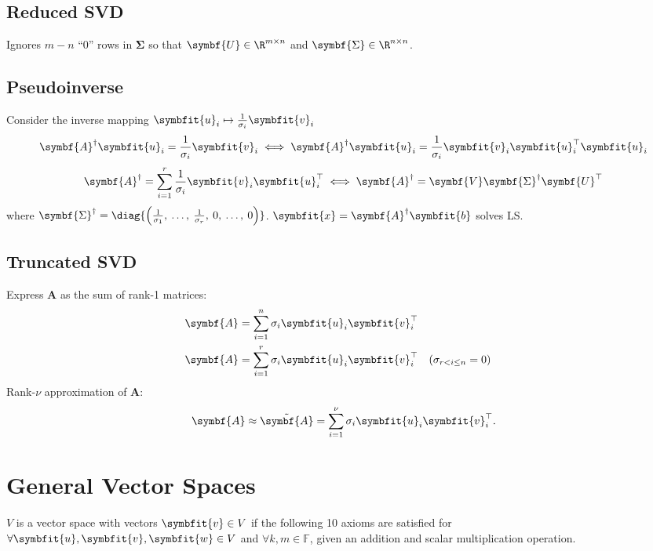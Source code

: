 \documentclass{article}
\begin{document}
\begin{multicols*}{3}
    \subsection{Reduced SVD}
    Ignores \(m - n\) ``0'' rows in \(\symbf{\Sigma}\) so that \(\symbf{U} \in \R^{m \times n}\) and \(\symbf{\Sigma} \in \R^{n \times n}\).
    \subsection{Pseudoinverse}
    Consider the inverse mapping \(\symbfit{u}_i \mapsto \frac{1}{\sigma_i} \symbfit{v}_i\)
    \begin{equation*}
        \symbf{A}^\dagger \symbfit{u}_i = \frac{1}{\sigma_i} \symbfit{v}_i
        \iff
        \symbf{A}^\dagger \symbfit{u}_i = \frac{1}{\sigma_i} \symbfit{v}_i \symbfit{u}^\top_i \symbfit{u}_i
    \end{equation*}
    \begin{equation*}
        \symbf{A}^\dagger = \sum_{i = 1}^r \frac{1}{\sigma_i} \symbfit{v}_i \symbfit{u}^\top_i
        \iff
        \symbf{A}^\dagger = \symbf{V} \symbf{\Sigma}^\dagger \symbf{U}^\top
    \end{equation*}
    where \(\symbf{\Sigma}^\dagger = \diag{\left( \frac{1}{\sigma_1},\: \dots,\: \frac{1}{\sigma_r},\: 0,\: \dots,\: 0 \right)}\).
    \(\symbfit{x} = \symbf{A}^\dagger \symbfit{b}\) solves LS\@.
    \subsection{Truncated SVD}
    Express \(\symbf{A}\) as the sum of rank-1 matrices:
    \begin{align*}
        \symbf{A} & = \sum_{i = 1}^n \sigma_i \symbfit{u}_i \symbfit{v}^\top_i                                  \\
        \symbf{A} & = \sum_{i = 1}^r \sigma_i \symbfit{u}_i \symbfit{v}^\top_i &  & (\sigma_{r < i \leq n} = 0)
    \end{align*}
    Rank-\(\nu\) approximation of \(\symbf{A}\):
    \begin{equation*}
        \symbf{A} \approx \tilde{\symbf{A}} = \sum_{i = 1}^\nu \sigma_i \symbfit{u}_i \symbfit{v}^\top_i.
    \end{equation*}
    \section{General Vector Spaces}
    \(V\) is a vector space with vectors \(\symbfit{v} \in V\) if the following 10 axioms are satisfied
    for \(\forall \symbfit{u}, \symbfit{v}, \symbfit{w} \in V\) and \(\forall k, m \in \mathbb{F}\),
    given an addition and scalar multiplication operation.


\end{multicols*}
\end{document}
